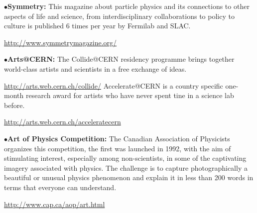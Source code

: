 \medskip





\medskip

\item{$\bullet$}{\bf Symmetry:}
This magazine about particle physics and its connections to other aspects of life and science, from interdisciplinary collaborations to policy to culture is published 6 times per year by Fermilab and SLAC.
     \item{}\qquad\url{http://www.symmetrymagazine.org/}
     \item{}

\medskip
\medskip





\medskip

\item{$\bullet$}{\bf Arts@CERN:} 
The Collide@CERN residency programme brings together world-class artists and scientists in a free exchange of ideas.
	\item{}\qquad\url{http://arts.web.cern.ch/collide/}
Accelerate@CERN is a country specific one-month research award for artists who have never spent tine in a science lab before.
	\item{}\qquad\url{http://arts.web.cern.ch/acceleratecern}


\medskip

\item{$\bullet$}{\bf Art of Physics Competition:}
The Canadian Association of Physicists organizes this competition, the first was launched in 1992, with the aim of stimulating interest, especially among non-scientists, in some of the captivating imagery associated with physics. The challenge is to capture photographically a beautiful or unusual physics phenomenon and explain it in less than 200 words in terms that everyone can understand.
	\item{}\qquad\url{http://www.cap.ca/aop/art.html}

